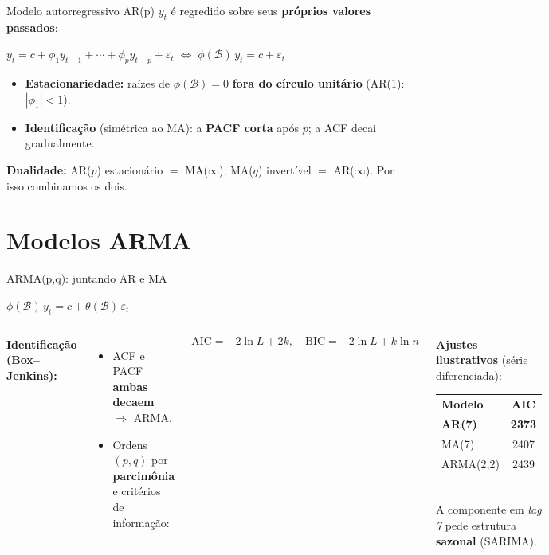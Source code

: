 \documentclass[aspectratio=169,11pt]{beamer}
\newcommand{\B}{\mathcal{B}}
\newcommand{\dest}[1]{\textcolor{emph}{\textbf{#1}}}
\newcommand{\bom}[1]{\textcolor{verde}{\textbf{#1}}}
\newcommand{\eqbox}[1]{\begin{center}\begin{tcolorbox}[enhanced,colback=white,opacityback=0.06,
   colframe=pitchred,boxrule=1.1pt,arc=2mm,coltext=white,width=0.92\linewidth,halign=center,
   top=1.4mm,bottom=1.4mm]$\displaystyle #1$\end{tcolorbox}\end{center}}
\begin{document}
\begin{frame}{Modelo autorregressivo AR(p)}
  $y_t$ é regredido sobre seus \dest{próprios valores passados}:
  \eqbox{y_t=c+\phi_1 y_{t-1}+\cdots+\phi_p y_{t-p}+\varepsilon_t
        \;\Longleftrightarrow\; \phi(\B)\,y_t=c+\varepsilon_t}
  \begin{itemize}
    \item \textbf{Estacionariedade:} raízes de $\phi(\B)=0$ \dest{fora do círculo
          unitário} (AR(1): $|\phi_1|<1$).
    \item \dest{Identificação} (simétrica ao MA): a \textbf{PACF corta} após $p$;
          a ACF decai gradualmente.
  \end{itemize}
  \begin{tcolorbox}[pitchbox]
    \footnotesize\textbf{Dualidade:} AR($p$) estacionário $=$ MA($\infty$); MA($q$)
    invertível $=$ AR($\infty$). Por isso combinamos os dois.
  \end{tcolorbox}
\end{frame}

\section{Modelos ARMA}

\begin{frame}{ARMA(p,q): juntando AR e MA}
  \eqbox{\phi(\B)\,y_t=c+\theta(\B)\,\varepsilon_t}
  \begin{columns}[T]
      \footnotesize\textbf{Identificação (Box--Jenkins):}
      \begin{itemize}\footnotesize
        \item ACF e PACF \dest{ambas decaem} $\Rightarrow$ ARMA.
        \item Ordens $(p,q)$ por \dest{parcimônia} e critérios de informação:
      \end{itemize}
      \[\text{AIC}=-2\ln L+2k,\quad \text{BIC}=-2\ln L+k\ln n\]
      \begin{tcolorbox}[pitchbox]
        \footnotesize \textbf{Ajustes ilustrativos} (série diferenciada):
        \begin{tabular}{lc}
          \textbf{Modelo} & \textbf{AIC}\\[0.2em]
          \bom{AR(7)} & \bom{2373}\\
          MA(7) & 2407\\
          ARMA(2,2) & 2439\\
        \end{tabular}\\[0.4em]
        A componente em \emph{lag 7} pede estrutura \dest{sazonal} (SARIMA).
      \end{tcolorbox}
  \end{columns}
\end{frame}
\end{document}
